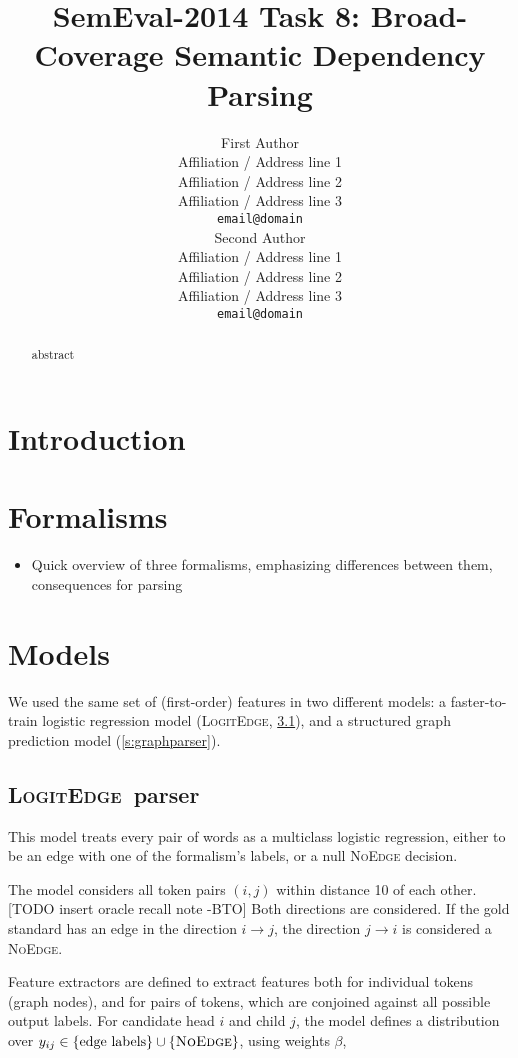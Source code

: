 \documentclass[11pt]{article}
\title{SemEval-2014 Task 8: Broad-Coverage Semantic Dependency Parsing}
\author{First Author \\
  Affiliation / Address line 1 \\
  Affiliation / Address line 2 \\
  Affiliation / Address line 3 \\
  {\tt email@domain} \\\And
  Second Author \\
  Affiliation / Address line 1 \\
  Affiliation / Address line 2 \\
  Affiliation / Address line 3 \\
  {\tt email@domain} \\}
\date{}
\newcommand{\bocomment}[1]{\textcolor{Bittersweet}{[#1 -BTO]}}
\begin{document}
\maketitle
\begin{abstract}
  abstract
\end{abstract}



\section{Introduction}



\section{Formalisms}

\begin{itemize}
\item Quick overview of three formalisms, emphasizing differences between them, consequences for parsing
\end{itemize}


\section{Models}
\newcommand{\logitedge}{\textsc{LogitEdge}}

We used the same set of (first-order) features
in two different models: a faster-to-train
logistic regression model (\logitedge, \ref{s:logitedge}),
and a structured graph prediction model (\ref{s:graphparser}).


\subsection{\logitedge\ parser} \label{s:logitedge}

This model treats every pair of words as a multiclass logistic regression,
either to be an edge with one of the formalism's labels, or a null
\textsc{NoEdge} decision.  


The model considers all token pairs $(i,j)$ within distance 10 of each other. \bocomment{TODO insert oracle recall note}  Both directions are considered.  If the gold standard has an edge in the direction $i \rightarrow j$, the direction $j\rightarrow i$ is considered a \textsc{NoEdge}.

Feature extractors are defined to extract features both for individual tokens (graph nodes), and for pairs of tokens, which are conjoined against all possible output labels.
For candidate head $i$ and child $j$, the model defines a distribution over
$y_{ij} \in \{\text{edge labels}\} \cup \{\textsc{NoEdge}\}$, using weights $\beta$,
\end{document}
